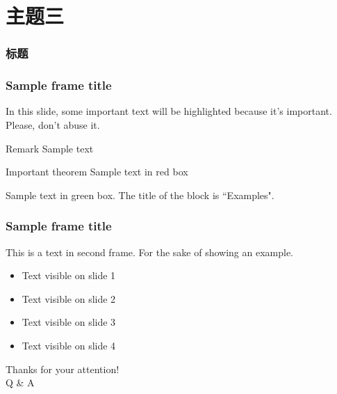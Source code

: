 \documentclass[12pt]{beamer}
\begin{document}
\section{主题三}

\begin{frame}
	\frametitle{标题}	
	
\end{frame}

\begin{frame}
	\frametitle{Sample frame title}
	
	In this slide, some important text will be
	\alert{highlighted} because it's important.
	Please, don't abuse it.
	
	\begin{block}{Remark}
		Sample text
	\end{block}
	
	\begin{alertblock}{Important theorem}
		Sample text in red box
	\end{alertblock}
	
	\begin{examples}
		Sample text in green box. The title of the block is ``Examples".
	\end{examples}
\end{frame}

\begin{frame}
	\frametitle{Sample frame title}
	This is a text in second frame. 
	For the sake of showing an example.
	
	\begin{itemize}
		\item<1-> Text visible on slide 1
		\item<2-> Text visible on slide 2
		\item<3> Text visible on slide 3
		\item<4-> Text visible on slide 4
	\end{itemize}
\end{frame}



\begin{frame}
	\begin{center}
		\huge Thanks for your attention! \\ Q \& A
	\end{center}
\end{frame}

\end{document}
